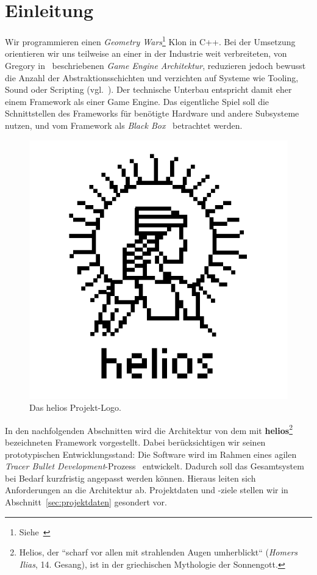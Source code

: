\section{Einleitung}

Wir programmieren einen \textit{Geometry Wars}\footnote{Siehe~\cite[]{WikipediaGeometryWars}} Klon in C++.
Bei der Umsetzung orientieren wir uns teilweise an einer in der Industrie weit verbreiteten, von Gregory in~\cite[]{Gre19} beschriebenen \textit{Game Engine Architektur}, reduzieren jedoch bewusst die Anzahl der Abstraktionsschichten und verzichten auf Systeme wie Tooling, Sound oder Scripting (vgl.~\cite[Figure~1.16, 39]{Gre19}).
Der technische Unterbau entspricht damit eher einem Framework als einer Game Engine.
Das eigentliche Spiel soll die Schnittstellen des Frameworks für benötigte Hardware und andere Subsysteme nutzen, und vom Framework als \textit{Black Box}~\cite[]{RB88} betrachtet werden.

\begin{figure}[tbp]
    \centering
    \includegraphics[width=0.5\columnwidth]{img/helios_logo}
    \caption{Das helios Projekt-Logo.}
    \label{fig:helios_logo}
\end{figure}

In den nachfolgenden Abschnitten wird die Architektur von dem mit \textbf{helios}\footnote{
    Helios, der ``scharf vor allen mit strahlenden Augen umherblickt`` (\textit{Homers Ilias}, 14. Gesang), ist in der griechischen Mythologie der Sonnengott.
} bezeichneten Framework vorgestellt.
Dabei berücksichtigen wir seinen prototypischen Entwicklungsstand:
Die Software wird im Rahmen eines agilen \textit{Tracer Bullet Development}-Prozess~\cite[50 f.]{TH20} entwickelt.
Dadurch soll das Gesamtsystem bei Bedarf kurzfristig angepasst werden können.
Hieraus leiten sich Anforderungen an die Architektur ab.
Projektdaten und -ziele stellen wir in Abschnitt~\ref{sec:projektdaten} gesondert vor.\par

